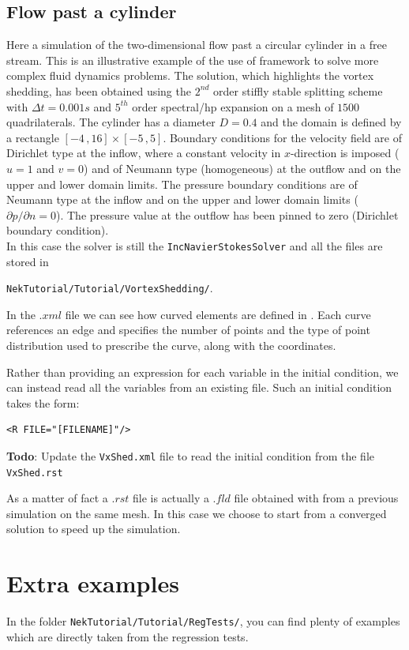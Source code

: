 \documentclass[a4paper,12pt]{article}
\begin{document}
\subsection{Flow past a cylinder}
Here a simulation of the two-dimensional flow past a circular cylinder in a free
stream. This is an illustrative example of the use of \nektar framework
to solve more complex fluid dynamics problems. The solution, which highlights
the vortex shedding, has been obtained using the $2^{nd}$ order stiffly stable
splitting scheme with $\Delta t = 0.001 s$ and $5^{th}$ order spectral/hp
expansion on a mesh of $1500$ quadrilaterals. The cylinder has a diameter $D =
0.4$ and the domain is defined by a rectangle $[-4\,,16] \times [-5\,,5]$.
Boundary conditions for the velocity field are of Dirichlet type at the inflow,
where a constant velocity in $x$-direction is imposed ($u = 1$ and $v = 0$) and
of Neumann type (homogeneous) at the outflow and on the upper and lower domain
limits. The pressure boundary conditions are of Neumann type at the inflow and
on the upper and lower domain limits ($\partial p/\partial n = 0$). The pressure
value at the outflow has been pinned to zero (Dirichlet boundary  condition).\\

In this case the solver is still the \texttt{IncNavierStokesSolver} and all
the files are stored in

\texttt{NekTutorial/Tutorial/VortexShedding/}.

In the $.xml$ file we can see how curved elements are defined in \nektar. Each
curve references an edge and specifies the number of points and the type of
point distribution used to prescribe the curve, along with the coordinates.

Rather than providing an expression for each variable in the initial condition,
we can instead read all the variables from an existing file. Such an initial
condition takes the form:
\begin{verbatim}
<R FILE="[FILENAME]"/>
\end{verbatim}

\textbf{Todo}: Update the \texttt{VxShed.xml} file to read the initial condition
from the file \texttt{VxShed.rst} 

As a matter of fact a $.rst$ file is actually a $.fld$ file obtained with
\nektar from a previous simulation on the same mesh. In this case we choose to
start from a converged solution to speed up the simulation.

\section{Extra examples}

In the folder \texttt{NekTutorial/Tutorial/RegTests/}, you can find plenty of
examples which are directly taken from the regression tests.
\end{document}
